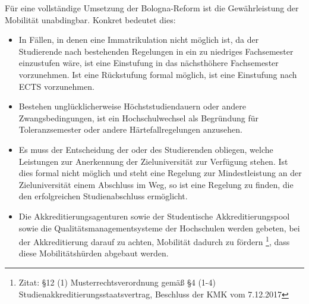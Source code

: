 Für eine vollständige Umsetzung der Bologna-Reform ist die Gewährleistung der
Mobilität unabdingbar. Konkret bedeutet dies:
\begin{itemize}

\item In Fällen, in denen eine Immatrikulation nicht möglich ist, da der Studierende
  nach bestehenden Regelungen in ein zu niedriges Fachsemester einzustufen wäre,
  ist eine Einstufung in das nächsthöhere Fachsemester vorzunehmen. Ist eine
  Rückstufung formal möglich, ist eine Einstufung nach ECTS vorzunehmen.
\item Bestehen unglücklicherweise Höchststudiendauern oder andere Zwangsbedingungen,
  ist ein Hochschulwechsel als Begründung für Toleranzsemester oder andere
  Härtefallregelungen anzusehen.
\item Es muss der Entscheidung der oder des Studierenden obliegen, welche Leistungen
  zur Anerkennung der Zieluniversität zur Verfügung stehen. Ist dies formal
  nicht möglich und steht eine Regelung zur Mindestleistung an der
  Zieluniversität einem Abschluss im Weg, so ist eine Regelung zu finden, die
  den erfolgreichen Studienabschluss ermöglicht.
\item Die Akkreditierungsagenturen sowie der Studentische Akkreditierungspool sowie die Qualitätsmanagementsysteme der Hochschulen werden
  gebeten, bei der Akkreditierung darauf zu achten, Mobilität dadurch zu
  fördern \footnote{Zitat: §12 (1) Musterrechtsverordnung gemäß §4 (1-4)
    Studienakkreditierungsstaatsvertrag, Beschluss der KMK vom 7.12.2017}, dass diese Mobilitätshürden abgebaut werden.
 \end{itemize}
